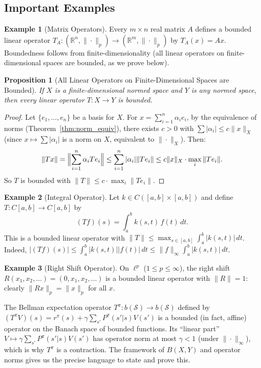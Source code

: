 \documentclass[11pt,a4paper]{article}
\theoremstyle{definition}
\newtheorem{example}{Example}[section]
\theoremstyle{plain}
\newtheorem{proposition}[theorem]{Proposition}
\theoremstyle{remark}
\newcommand{\R}{\mathbb{R}}
\begin{document}
\subsection{Important Examples}

\begin{example}[Matrix Operators]
\label{ex:matrix_op}
Every $m \times n$ real matrix $A$ defines a bounded linear operator
$T_A \colon (\R^n, \|\cdot\|_p) \to (\R^m, \|\cdot\|_p)$ by $T_A(x) = Ax$.
Boundedness follows from finite-dimensionality (all linear operators on
finite-dimensional spaces are bounded, as we prove below).
\end{example}

\begin{proposition}[All Linear Operators on Finite-Dimensional Spaces are Bounded]
\label{prop:finite_dim_bounded}
If $X$ is a finite-dimensional normed space and $Y$ is any normed space, then
every linear operator $T \colon X \to Y$ is bounded.
\end{proposition}

\begin{proof}
Let $\{e_1, \ldots, e_n\}$ be a basis for $X$. For $x = \sum_{i=1}^n \alpha_i e_i$,
by the equivalence of norms (Theorem~\ref{thm:norm_equiv}), there exists $c > 0$
with $\sum |\alpha_i| \le c \|x\|_X$ (since $x \mapsto \sum |\alpha_i|$ is a norm
on $X$, equivalent to $\|\cdot\|_X$). Then:
\[
\|Tx\| = \Bigl\|\sum_{i=1}^n \alpha_i Te_i\Bigr\| \le \sum_{i=1}^n |\alpha_i| \|Te_i\|
\le c \|x\|_X \cdot \max_i \|Te_i\|.
\]
So $T$ is bounded with $\|T\| \le c \cdot \max_i \|Te_i\|$.
\end{proof}

\begin{example}[Integral Operator]
\label{ex:integral_op}
Let $k \in C([a,b] \times [a,b])$ and define $T \colon C[a,b] \to C[a,b]$ by
\[
(Tf)(s) = \int_a^b k(s,t)\, f(t)\, dt.
\]
This is a bounded linear operator with
$\|T\| \le \max_{s \in [a,b]} \int_a^b |k(s,t)|\, dt$.
Indeed, $|(Tf)(s)| \le \int_a^b |k(s,t)| |f(t)|\, dt \le \|f\|_\infty \int_a^b |k(s,t)|\, dt$.
\end{example}

\begin{example}[Right Shift Operator]
\label{ex:shift}
On $\ell^p$ ($1 \le p \le \infty$), the right shift $R(x_1, x_2, \ldots) =
(0, x_1, x_2, \ldots)$ is a bounded linear operator with $\|R\| = 1$: clearly
$\|Rx\|_p = \|x\|_p$ for all $x$.
\end{example}

\begin{rlconnection}
The Bellman expectation operator $T^\pi \colon b(\mathcal{S}) \to b(\mathcal{S})$
defined by $(T^\pi V)(s) = r^\pi(s) + \gamma \sum_{s'} P^\pi(s'|s) V(s')$ is a
bounded (in fact, affine) operator on the Banach space of bounded functions. Its
``linear part'' $V \mapsto \gamma \sum_{s'} P^\pi(s'|s) V(s')$ has operator norm
at most $\gamma < 1$ (under $\|\cdot\|_\infty$), which is why $T^\pi$ is a
contraction. The framework of $B(X,Y)$ and operator norms gives us the precise
language to state and prove this.
\end{rlconnection}
\end{document}
